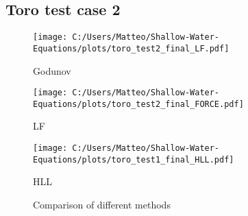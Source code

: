 \subsection{Toro test case 2}

\begin{figure}[H]
    \centering
    \begin{minipage}{0.45\textwidth}
        \centering
        \texttt{[image: C:/Users/Matteo/Shallow-Water-Equations/plots/toro\_test2\_final\_LF.pdf]}
        \caption{Godunov}
    \end{minipage}%
    \hfill
    \begin{minipage}{0.45\textwidth}
        \centering
        \texttt{[image: C:/Users/Matteo/Shallow-Water-Equations/plots/toro\_test2\_final\_FORCE.pdf]}
        \caption{LF}
    \end{minipage}
    
    \vspace{0.5cm} %
    \begin{minipage}{0.45\textwidth}
        \centering
        \texttt{[image: C:/Users/Matteo/Shallow-Water-Equations/plots/toro\_test1\_final\_HLL.pdf]}
        \caption{HLL}
    \end{minipage}
    \caption{Comparison of different methods}
\end{figure}



